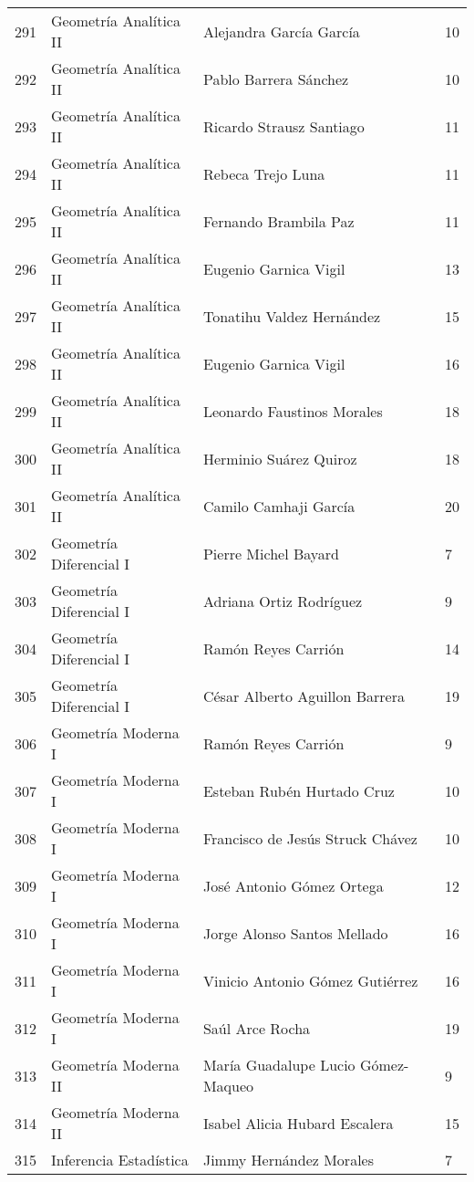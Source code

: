 \begin{table}[ht]
\begin{tabular}{rlll}
  291 & Geometría Analítica II & Alejandra García García & 10 \\ 
  292 & Geometría Analítica II & Pablo Barrera Sánchez & 10 \\ 
  293 & Geometría Analítica II & Ricardo Strausz Santiago & 11 \\ 
  294 & Geometría Analítica II & Rebeca Trejo Luna & 11 \\ 
  295 & Geometría Analítica II & Fernando Brambila Paz & 11 \\ 
  296 & Geometría Analítica II & Eugenio Garnica Vigil & 13 \\ 
  297 & Geometría Analítica II & Tonatihu Valdez Hernández & 15 \\ 
  298 & Geometría Analítica II & Eugenio Garnica Vigil & 16 \\ 
  299 & Geometría Analítica II & Leonardo Faustinos Morales & 18 \\ 
  300 & Geometría Analítica II & Herminio Suárez Quiroz & 18 \\ 
  301 & Geometría Analítica II & Camilo Camhaji García & 20 \\ 
  302 & Geometría Diferencial I & Pierre Michel Bayard & 7 \\ 
  303 & Geometría Diferencial I & Adriana Ortiz Rodríguez & 9 \\ 
  304 & Geometría Diferencial I & Ramón Reyes Carrión & 14 \\ 
  305 & Geometría Diferencial I & César Alberto Aguillon Barrera & 19 \\ 
  306 & Geometría Moderna I & Ramón Reyes Carrión & 9 \\ 
  307 & Geometría Moderna I & Esteban Rubén Hurtado Cruz & 10 \\ 
  308 & Geometría Moderna I & Francisco de Jesús Struck Chávez & 10 \\ 
  309 & Geometría Moderna I & José Antonio Gómez Ortega & 12 \\ 
  310 & Geometría Moderna I & Jorge Alonso Santos Mellado & 16 \\ 
  311 & Geometría Moderna I & Vinicio Antonio Gómez Gutiérrez & 16 \\ 
  312 & Geometría Moderna I & Saúl Arce Rocha & 19 \\ 
  313 & Geometría Moderna II & María Guadalupe Lucio Gómez-Maqueo & 9 \\ 
  314 & Geometría Moderna II & Isabel Alicia Hubard Escalera & 15 \\ 
  315 & Inferencia Estadística & Jimmy Hernández Morales & 7 \\ 

\end{tabular}
\end{table}
